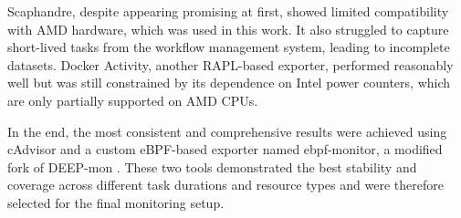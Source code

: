 Scaphandre, despite appearing promising at first, showed limited compatibility with AMD hardware, which was used in this work. It also struggled to capture short-lived tasks from the workflow management system, leading to incomplete datasets. Docker Activity, another RAPL-based exporter, performed reasonably well but was still constrained by its dependence on Intel power counters, which are only partially supported on AMD CPUs.

In the end, the most consistent and comprehensive results were achieved using cAdvisor and a custom eBPF-based exporter named ebpf-monitor, a modified fork of DEEP-mon \cite{8425477}. These two tools demonstrated the best stability and coverage across different task durations and resource types and were therefore selected for the final monitoring setup.

